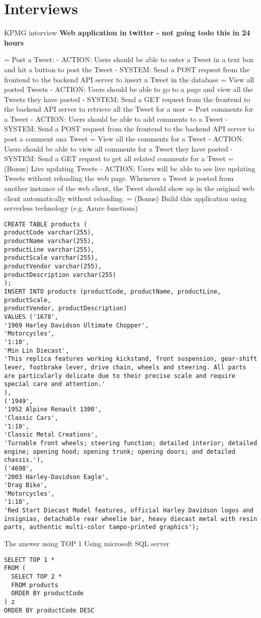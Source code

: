 
\chapter{Interviews}
KPMG interview
\textbf{Web application in twitter - not going todo this in 24 hours}

= Post a Tweet:
- ACTION: Users should be able to enter a Tweet in a text box and hit a button to post the Tweet
- SYSTEM: Send a POST request from the frontend to the backend API server to insert a Tweet in
the database
= View all posted Tweets
- ACTION: Users should be able to go to a page and view all the Tweets they have posted
- SYSTEM: Send a GET request from the frontend to the backend API server to retrieve all the Tweet
for a user
= Post comments for a Tweet
- ACTION: Users should be able to add comments to a Tweet
- SYSTEM: Send a POST request from the frontend to the backend API server to post a comment
ona Tweet
= View all the comments for a Tweet
- ACTION: Users should be able to view all comments for a Tweet they have posted
- SYSTEM: Send a GET request to get all related comments for a Tweet
= (Bonus) Live updating Tweets
- ACTION: Users will be able to see live updating Tweets without reloading the web page. Whenever
a Tweet is posted from another instance of the web client, the Tweet should show up in the original
web client automatically without reloading.
= (Bonus) Build this application using serverless technology (e.g. Azure functions)

\begin{lstlisting}[caption={SQL Query for KPMG Interview}]
CREATE TABLE products (
productCode varchar(255),
productName varchar(255),
productLine varchar(255),
productScale varchar(255),
productVendor varchar(255),
productDescription varchar(255)
);
INSERT INTO products (productCode, productName, productLine, productScale,
productVendor, productDescription)
VALUES ('1678',
'1969 Harley Davidson Ultimate Chopper',
'Motorcycles',
'1:10',
'Min Lin Diecast',
'This replica features working kickstand, front suspension, gear-shift lever, footbrake lever, drive chain, wheels and steering. All parts are particularly delicate due to their precise scale and require special care and attention.'
),
('1949',
'1952 Alpine Renault 1300',
'Classic Cars',
'1:10',
'Classic Metal Creations',
'Turnable front wheels; steering function; detailed interior; detailed engine; opening hood; opening trunk; opening doors; and detailed chassis.'),
('4698',
'2003 Harley-Davidson Eagle',
'Drag Bike',
'Motorcycles',
'1:10',
'Red Start Diecast Model features, official Harley Davidson logos and insignias, detachable rear wheelie bar, heavy diecast metal with resin parts, authentic multi-color tampo-printed graphics');
\end{lstlisting}

The answer using TOP 1 Using microsoft SQL server
\begin{lstlisting}[caption={SQL Query for KPMG Interview -- Answer}]
SELECT TOP 1 *
FROM (
  SELECT TOP 2 * 
  FROM products
  ORDER BY productCode
) z
ORDER BY productCode DESC
\end{lstlisting}
